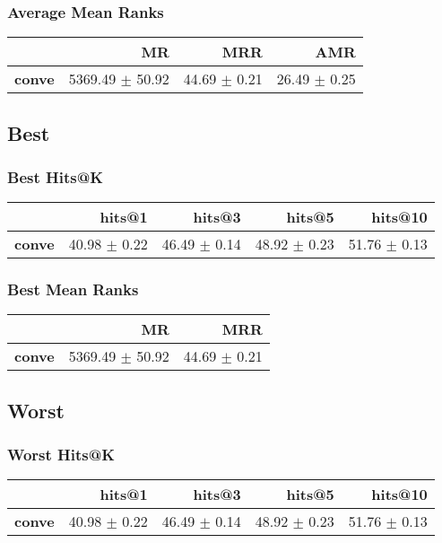 \documentclass{article}
\begin{document}
    \subsubsection{Average Mean Ranks}
    \begin{center}
    \begin{tabular}{lrrr}
\toprule
{} &               MR &           MRR &           AMR \\
\midrule
\textbf{conve} &  5369.49 $\pm$ 50.92 &  44.69 $\pm$ 0.21 &  26.49 $\pm$ 0.25 \\
\bottomrule
\end{tabular}

    \end{center}
    \subsection{Best}
    \subsubsection{Best Hits@K}
    \begin{center}
    \begin{tabular}{lrrrr}
\toprule
{} &        hits@1 &        hits@3 &        hits@5 &       hits@10 \\
\midrule
\textbf{conve} &  40.98 $\pm$ 0.22 &  46.49 $\pm$ 0.14 &  48.92 $\pm$ 0.23 &  51.76 $\pm$ 0.13 \\
\bottomrule
\end{tabular}

    \end{center}
    \subsubsection{Best Mean Ranks}
    \begin{center}
    \begin{tabular}{lrr}
\toprule
{} &               MR &           MRR \\
\midrule
\textbf{conve} &  5369.49 $\pm$ 50.92 &  44.69 $\pm$ 0.21 \\
\bottomrule
\end{tabular}

    \end{center}
    \subsection{Worst}
    \subsubsection{Worst Hits@K}
    \begin{center}
    \begin{tabular}{lrrrr}
\toprule
{} &        hits@1 &        hits@3 &        hits@5 &       hits@10 \\
\midrule
\textbf{conve} &  40.98 $\pm$ 0.22 &  46.49 $\pm$ 0.14 &  48.92 $\pm$ 0.23 &  51.76 $\pm$ 0.13 \\
\bottomrule
\end{tabular}

    \end{center}
\end{document}

